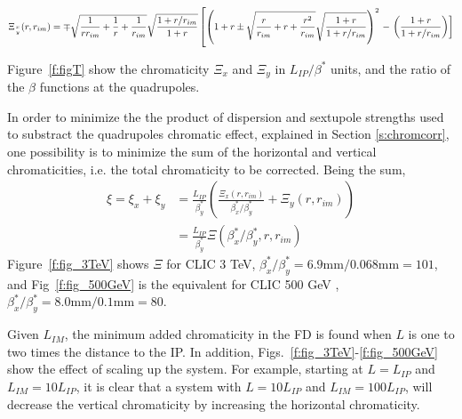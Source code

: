 {\scriptsize
\begin{equation}
 \Xi_{x\atop y}(r,r_{im})=\mp\sqrt{\frac{1}{rr_{im}}+\frac{1}{r}+\frac{1}{r_{im}}}\sqrt{\frac{1+r/r_{im}}{1+r}} \left[\left(1+r\pm\sqrt{\frac{r}{r_{im}}+r+\frac{r^2}{r_{im}}}\sqrt{\frac{1+r}{1+r/r_{im}}}\right)^2\right.-\left.\left(\frac{1+r}{1+r/r_{im}}\right)\right]
\end{equation}}\par
Figure~\ref{f:figT} show the chromaticity $\Xi_x$ and $\Xi_y$ in $L_{IP}/\beta^*$ units, and the ratio of the $\beta$ functions at the quadrupoles.\par
In order to minimize the the product of dispersion and sextupole strengths used to substract the quadrupoles chromatic effect, explained in Section \ref{s:chromcorr}, one possibility is to minimize the sum of the horizontal and vertical chromaticities, i.e. the total chromaticity to be corrected. Being the sum, 
\begin{align}
 \xi = \xi_x + \xi_y &= \frac{L_{IP}}{\beta^*_y}\left(\frac{\Xi_x(r,r_{im})}{\beta^*_x/\beta^*_y}+\Xi_y(r,r_{im})\right)\\
 &= \frac{L_{IP}}{\beta^*_y}\Xi(\beta^*_x/\beta^*_y,r,r_{im})
\end{align}
Figure~\ref{f:fig_3TeV} shows $\Xi$ for CLIC 3 TeV, $\beta^*_x/\beta^*_y=6.9\text{mm}/0.068\text{mm}=101$, and Fig~\ref{f:fig_500GeV} is the equivalent for CLIC 500 GeV \cite{CLICdes}, $\beta^*_x/\beta^*_y=8.0\text{mm}/0.1\text{mm}=80$.\par
Given $L_{IM}$, the minimum added chromaticity in the FD is found when $L$ is one to two times the distance to the IP. In addition, Figs.~\ref{f:fig_3TeV}-\ref{f:fig_500GeV} show the effect of scaling up the system. For example, starting at $L=L_{IP}$ and $L_{IM}=10L_{IP}$, it is clear that a system with $L=10L_{IP}$ and $L_{IM}=100L_{IP}$, will decrease the vertical chromaticity by increasing the horizontal chromaticity.
